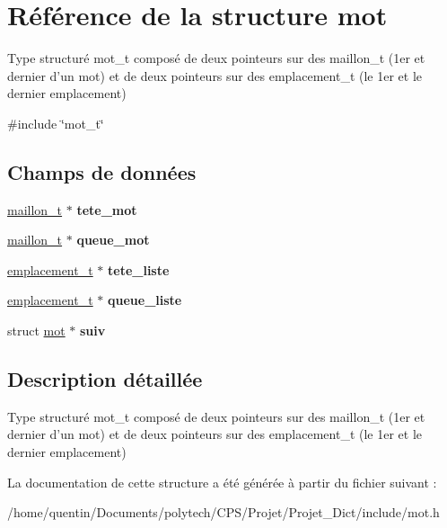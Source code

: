 \hypertarget{structmot}{\section{Référence de la structure mot}
\label{structmot}
}


Type structuré mot\-\_\-t composé de deux pointeurs sur des maillon\-\_\-t (1er et dernier d'un mot) et de deux pointeurs sur des emplacement\-\_\-t (le 1er et le dernier emplacement)  




{\ttfamily \#include \char`\"{}mot\-\_\-t\char`\"{}}

\subsection*{Champs de données}
\begin{DoxyCompactItemize}
\item 
\hypertarget{structmot_ad0e01eaab1e623c98836806dbeaa9dc9}{\hyperlink{structmaillon}{maillon\-\_\-t} $\ast$ {\bfseries tete\-\_\-mot}}\label{structmot_ad0e01eaab1e623c98836806dbeaa9dc9}

\item 
\hypertarget{structmot_adb32f56db39af1e7058a4e835fefd9c2}{\hyperlink{structmaillon}{maillon\-\_\-t} $\ast$ {\bfseries queue\-\_\-mot}}\label{structmot_adb32f56db39af1e7058a4e835fefd9c2}

\item 
\hypertarget{structmot_a2315df5afe2b4b460bdd4de3d9c3d284}{\hyperlink{structemplacement}{emplacement\-\_\-t} $\ast$ {\bfseries tete\-\_\-liste}}\label{structmot_a2315df5afe2b4b460bdd4de3d9c3d284}

\item 
\hypertarget{structmot_a3f642b9bc61ce20950c61e2a46dcea98}{\hyperlink{structemplacement}{emplacement\-\_\-t} $\ast$ {\bfseries queue\-\_\-liste}}\label{structmot_a3f642b9bc61ce20950c61e2a46dcea98}

\item 
\hypertarget{structmot_a13c0494735483209463d5e8e3d384221}{struct \hyperlink{structmot}{mot} $\ast$ {\bfseries suiv}}\label{structmot_a13c0494735483209463d5e8e3d384221}

\end{DoxyCompactItemize}


\subsection{Description détaillée}
Type structuré mot\-\_\-t composé de deux pointeurs sur des maillon\-\_\-t (1er et dernier d'un mot) et de deux pointeurs sur des emplacement\-\_\-t (le 1er et le dernier emplacement) 

La documentation de cette structure a été générée à partir du fichier suivant \-:\begin{DoxyCompactItemize}
\item 
/home/quentin/\-Documents/polytech/\-C\-P\-S/\-Projet/\-Projet\-\_\-\-Dict/include/mot.\-h\end{DoxyCompactItemize}
